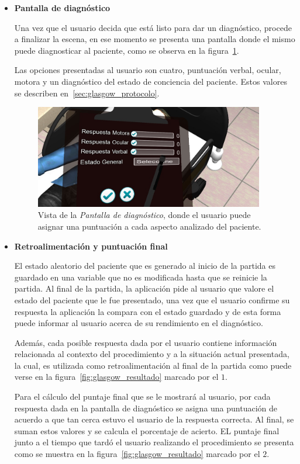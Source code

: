 \begin{itemize}
\item{\textbf{Pantalla de diagnóstico}}

Una vez que el usuario decida que está listo para dar un diagnóstico, procede a
finalizar la escena, en ese momento se presenta una pantalla donde el mismo
puede diagnosticar al paciente, como se observa en la
figura~\ref{fig:glasgow_gui_resultados}.

Las opciones presentadas al usuario son cuatro, puntuación verbal, ocular,
motora y un diagnóstico del estado de conciencia del paciente. Estos valores
se describen en~\ref{sec:glasgow_protocolo}.

\begin{figure}[H]
\centering
\includegraphics[width=10cm]{solucion/images/glasgow_diagnostico.jpg}
\caption{Vista de la \emph{Pantalla de diagnóstico}, donde el usuario puede
    asignar una puntuación a cada aspecto analizado del paciente.}
\label{fig:glasgow_gui_resultados}
\end{figure}

\item{\textbf{Retroalimentación y puntuación final}}

El estado aleatorio del paciente que es generado al inicio de la partida es
guardado en una variable que no es modificada hasta que se reinicie la partida.
Al final de la partida, la aplicación pide al usuario que valore el estado del
paciente que le fue presentado, una vez que el usuario confirme su respuesta la
aplicación la compara con el estado guardado y de esta forma puede informar al
usuario acerca de su rendimiento en el diagnóstico. 

Además, cada posible respuesta dada por el usuario contiene información
relacionada al contexto del procedimiento y a la situación actual presentada, la
cual, es utilizada como retroalimentación al final de la partida como puede
verse en la figura~\ref{fig:glasgow_resultado} marcado por el $1$. 

Para el cálculo del puntaje final que se le mostrará al usuario, por cada
respuesta dada en la pantalla de diagnóstico se asigna una puntuación de acuerdo
a que tan cerca estuvo el usuario de la respuesta correcta. Al final, se suman
estos valores y se calcula el porcentaje de acierto. EL puntaje final junto a el
tiempo que tardó el usuario realizando el procedimiento se presenta como se
muestra en la figura~\ref{fig:glasgow_resultado} marcado por el $2$.


\end{itemize}
